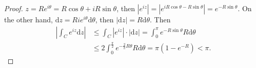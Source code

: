 \begin{proof}
  $z = R e^{i\theta} = R \cos \theta + i R \sin \theta$, then $|e^{iz}| = |e^{iR \cos \theta - R \sin \theta}| = e^{-R \sin \theta}$.
  On the other hand, $\mathrm{d}z = Rie^{i\theta}\mathrm{d} \theta$, then $|\mathrm{d} z| = R \mathrm{d} \theta$.
  Then
  \begin{align}
    \left| \int_C e^{iz}\mathrm{d} z \right| &\leq \int_C |e^{iz}| \cdot |\mathrm{d} z|
    = \int_0^{\pi} e^{-R \sin \theta}R \mathrm{d} \theta \\
    &\leq 2 \int_0^{\frac{\pi}{2}} e^{- \frac{2}{\pi} R \theta}R \mathrm{d}\theta = \pi(1 - e^{-R}) < \pi.
  \end{align}
\end{proof}




